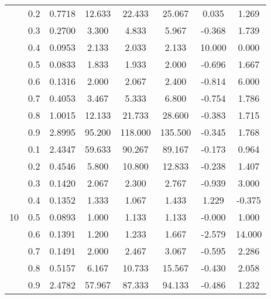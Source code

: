 \documentclass[11pt,a4paper]{report}
\begin{document}
\begin{longtable}{ | c | c || c | c | c | c | c | c | }
 & 0.2 & 0.7718 & 12.633 & 22.433 & 25.067 & 0.035 & 1.269 \\
 & 0.3 & 0.2700 & 3.300 & 4.833 & 5.967 & -0.368 & 1.739 \\
 & 0.4 & 0.0953 & 2.133 & 2.033 & 2.133 & 10.000 & 0.000 \\
 & 0.5 & 0.0833 & 1.833 & 1.933 & 2.000 & -0.696 & 1.667 \\
 & 0.6 & 0.1316 & 2.000 & 2.067 & 2.400 & -0.814 & 6.000 \\
 & 0.7 & 0.4053 & 3.467 & 5.333 & 6.800 & -0.754 & 1.786 \\
 & 0.8 & 1.0015 & 12.133 & 21.733 & 28.600 & -0.383 & 1.715 \\
 & 0.9 & 2.8995 & 95.200 & 118.000 & 135.500 & -0.345 & 1.768 \\
 \hline
\multirow{9}{*}{10} & 0.1 & 2.4347 & 59.633 & 90.267 & 89.167 & -0.173 & 0.964 \\
 & 0.2 & 0.4546 & 5.800 & 10.800 & 12.833 & -0.238 & 1.407 \\
 & 0.3 & 0.1420 & 2.067 & 2.300 & 2.767 & -0.939 & 3.000 \\
 & 0.4 & 0.1352 & 1.333 & 1.067 & 1.433 & 1.229 & -0.375 \\
 & 0.5 & 0.0893 & 1.000 & 1.133 & 1.133 & -0.000 & 1.000 \\
 & 0.6 & 0.1391 & 1.200 & 1.233 & 1.667 & -2.579 & 14.000 \\
 & 0.7 & 0.1491 & 2.000 & 2.467 & 3.067 & -0.595 & 2.286 \\
 & 0.8 & 0.5157 & 6.167 & 10.733 & 15.567 & -0.430 & 2.058 \\
 & 0.9 & 2.4782 & 57.967 & 87.333 & 94.133 & -0.486 & 1.232 \\
 \hline
\hline
\end{longtable}
\end{document}
